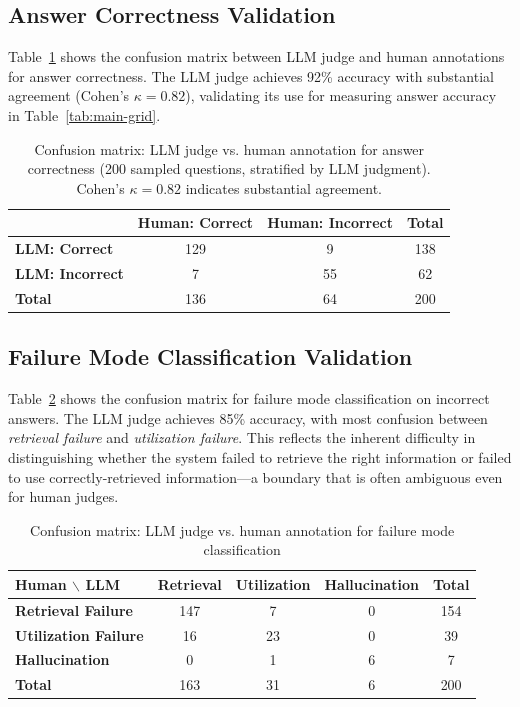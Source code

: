 \documentclass{article} %
\begin{document}
\subsection{Answer Correctness Validation}

Table~\ref{tab:llm-human-correctness} shows the confusion matrix between LLM judge and human annotations for answer correctness. The LLM judge achieves 92\% accuracy with substantial agreement (Cohen's $\kappa = 0.82$), validating its use for measuring answer accuracy in Table~\ref{tab:main-grid}.

\begin{table}[H]
\caption{Confusion matrix: LLM judge vs. human annotation for answer correctness (200 sampled questions, stratified by LLM judgment). Cohen's $\kappa = 0.82$ indicates substantial agreement.}
\label{tab:llm-human-correctness}
\centering
\begin{tabular}{lcc|c}
\toprule
& \textbf{Human: Correct} & \textbf{Human: Incorrect} & \textbf{Total} \\
\midrule
\textbf{LLM: Correct} & 129 & 9 & 138 \\
\textbf{LLM: Incorrect} & 7 & 55 & 62 \\
\midrule
\textbf{Total} & 136 & 64 & 200 \\
\bottomrule
\end{tabular}
\end{table}
\subsection{Failure Mode Classification Validation}

Table~\ref{tab:llm-human-failure} shows the confusion matrix for failure mode classification on incorrect answers. The LLM judge achieves 85\% accuracy, with most confusion between \textit{retrieval failure} and \textit{utilization failure}. This reflects the inherent difficulty in distinguishing whether the system failed to retrieve the right information or failed to use correctly-retrieved information—a boundary that is often ambiguous even for human judges.

\begin{table}[H]
\caption{Confusion matrix: LLM judge vs. human annotation for failure mode classification}
\label{tab:llm-human-failure}
\centering
\begin{tabular}{lccc|c}
\toprule
\textbf{Human $\backslash$ LLM} & \textbf{Retrieval} & \textbf{Utilization} & \textbf{Hallucination} & \textbf{Total} \\
\midrule
\textbf{Retrieval Failure} & 147 & 7 & 0 & 154 \\
\textbf{Utilization Failure} & 16 & 23 & 0 & 39 \\
\textbf{Hallucination} & 0 & 1 & 6 & 7 \\
\midrule
\textbf{Total} & 163 & 31 & 6 & 200 \\
\bottomrule
\end{tabular}
\end{table}
\end{document}
